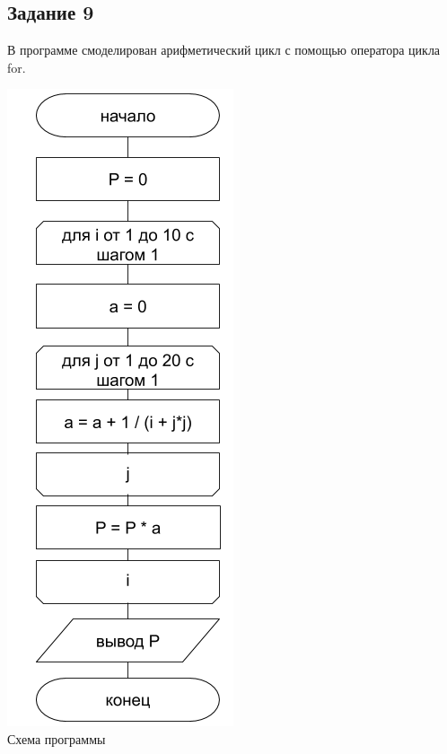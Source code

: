 \documentclass[a4paper,14pt]{extarticle}
\begin{document}
\subsection{Задание 9}
В программе смоделирован арифметический цикл с помощью оператора цикла for.
\begin{center}
\includegraphics[scale=0.6]{lab2-9.png}\\
Схема программы
\end{center}

\end{document}
